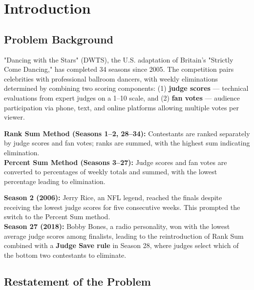 \documentclass{mcmthesis}
\begin{document}
\maketitle
\tableofcontents
\newpage

\section{Introduction}
\subsection{Problem Background}

"Dancing with the Stars" (DWTS), the U.S. adaptation of Britain's "Strictly Come Dancing," has completed 34 seasons since 2005. The competition pairs celebrities with professional ballroom dancers, with weekly eliminations determined by combining two scoring components: (1) \textbf{judge scores} --- technical evaluations from expert judges on a 1--10 scale, and (2) \textbf{fan votes} --- audience participation via phone, text, and online platforms allowing multiple votes per viewer.

\noindent\textbf{Rank Sum Method (Seasons 1--2, 28--34):} Contestants are ranked separately by judge scores and fan votes; ranks are summed, with the highest sum indicating elimination.\\
\textbf{Percent Sum Method (Seasons 3--27):} Judge scores and fan votes are converted to percentages of weekly totals and summed, with the lowest percentage leading to elimination.

\noindent\textbf{Season 2 (2006):} Jerry Rice, an NFL legend, reached the finals despite receiving the lowest judge scores for five consecutive weeks. This prompted the switch to the Percent Sum method.\\
\textbf{Season 27 (2018):} Bobby Bones, a radio personality, won with the lowest average judge scores among finalists, leading to the reintroduction of Rank Sum combined with a \textbf{Judge Save rule} in Season 28, where judges select which of the bottom two contestants to eliminate.

\subsection{Restatement of the Problem}
\end{document}
